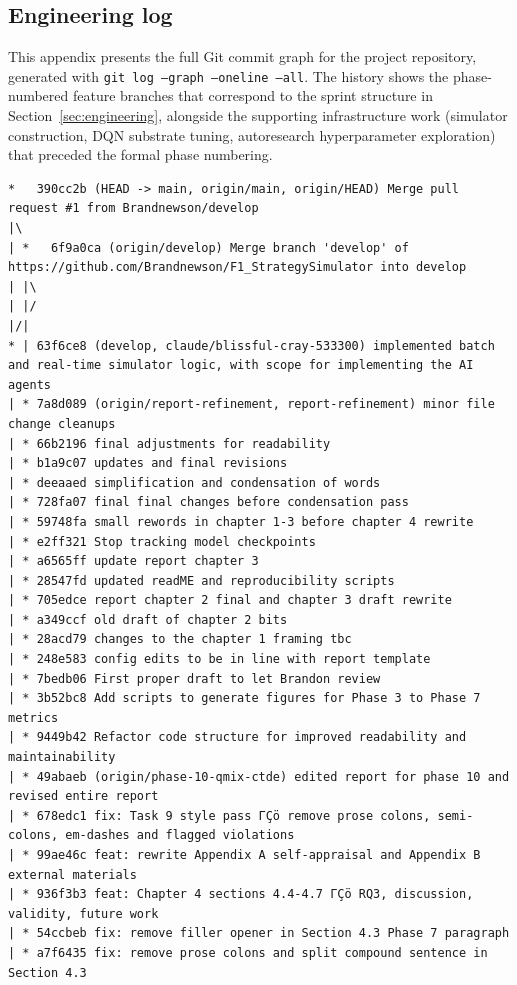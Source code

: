 \begin{appendices}
\chapter{Engineering log}
\label{appendix:engineering-log}

This appendix presents the full Git commit graph for the project repository, generated with \texttt{git log --graph --oneline --all}. The history shows the phase-numbered feature branches that correspond to the sprint structure in Section~\ref{sec:engineering}, alongside the supporting infrastructure work (simulator construction, DQN substrate tuning, autoresearch hyperparameter exploration) that preceded the formal phase numbering.

\begin{small}
\begin{verbatim}
*   390cc2b (HEAD -> main, origin/main, origin/HEAD) Merge pull request #1 from Brandnewson/develop
|\  
| *   6f9a0ca (origin/develop) Merge branch 'develop' of https://github.com/Brandnewson/F1_StrategySimulator into develop
| |\  
| |/  
|/|   
* | 63f6ce8 (develop, claude/blissful-cray-533300) implemented batch and real-time simulator logic, with scope for implementing the AI agents
| * 7a8d089 (origin/report-refinement, report-refinement) minor file change cleanups
| * 66b2196 final adjustments for readability
| * b1a9c07 updates and final revisions
| * deeaaed simplification and condensation of words
| * 728fa07 final final changes before condensation pass
| * 59748fa small rewords in chapter 1-3 before chapter 4 rewrite
| * e2ff321 Stop tracking model checkpoints
| * a6565ff update report chapter 3
| * 28547fd updated readME and reproducibility scripts
| * 705edce report chapter 2 final and chapter 3 draft rewrite
| * a349ccf old draft of chapter 2 bits
| * 28acd79 changes to the chapter 1 framing tbc
| * 248e583 config edits to be in line with report template
| * 7bedb06 First proper draft to let Brandon review
| * 3b52bc8 Add scripts to generate figures for Phase 3 to Phase 7 metrics
| * 9449b42 Refactor code structure for improved readability and maintainability
| * 49abaeb (origin/phase-10-qmix-ctde) edited report for phase 10 and revised entire report
| * 678edc1 fix: Task 9 style pass ΓÇö remove prose colons, semi-colons, em-dashes and flagged violations
| * 99ae46c feat: rewrite Appendix A self-appraisal and Appendix B external materials
| * 936f3b3 feat: Chapter 4 sections 4.4-4.7 ΓÇö RQ3, discussion, validity, future work
| * 54ccbeb fix: remove filler opener in Section 4.3 Phase 7 paragraph
| * a7f6435 fix: remove prose colons and split compound sentence in Section 4.3

\end{verbatim}
\end{small}
\end{appendices}
